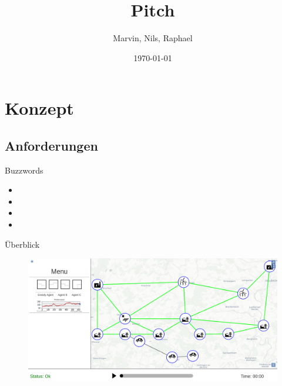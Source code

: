 \documentclass[22pt]{beamer}
\begin{document}


\date{\today}


\title[#enBW24Hack]{Pitch}

\author{Marvin, Nils, Raphael}


\begin{frame}

  \titlepage
	
\end{frame}




\section{Konzept}
\subsection{Anforderungen}
    \begin{frame}{Buzzwords}
    \begin{itemize}
        \item<1-> 
        \item<2-> 
        \item<3-> 
        \item<4->
    \end{itemize}
    \end{frame}



  \begin{frame}{Überblick}
    \begin{figure}[!h]
      \centering
      \includegraphics[width=115mm]{resources/overview.png}
      \label{fig:overview}
    \end{figure}
	\end{frame}
\end{document}
